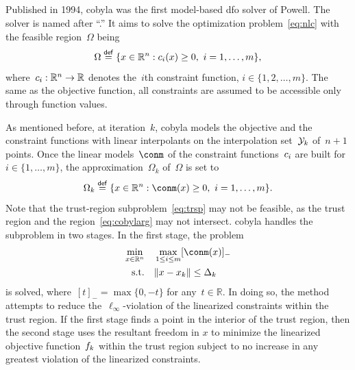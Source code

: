 \documentclass[
    smallextended,  %
    final,        %
]{svjour3}
\newcommand{\R}{\mathbb{R}}
\newcommand{\con}[1][i]{c\ifthenelse{\equal{#1}{}}{}{_{#1}}}
\newcommand{\eqdef}{\mathrel{\stackrel{\mathsf{def}}{=}}}
\newcommand{\fsetm}[1][k]{\Omega_{#1}}
\newcommand{\fset}{\Omega}
\newcommand{\iter}[1][k]{x\ifthenelse{\equal{#1}{}}{}{_{#1}}}
\newcommand{\norm}[2][]{#1\lVert#2#1\rVert}
\newcommand{\objm}[1][k]{\obj\ifthenelse{\equal{#1}{}}{}{_{#1}}}
\newcommand{\obj}{f}
\newcommand{\rad}[1][k]{\Delta\ifthenelse{\equal{#1}{}}{}{_{#1}}}
\newcommand{\set}[2][]{#1\{#2#1\}}
\newcommand{\st}{\text{s.t.}}
\newcommand{\xpt}[1][k]{\mathcal{Y}\ifthenelse{\equal{#1}{}}{}{_{#1}}}
\begin{document}
\subsection{}
\label{ssec:cobyla}

Published in 1994, \gls{cobyla} was the first model-based \gls{dfo} solver of Powell.
The solver is named after ``.''
It aims to solve the optimization problem~\eqref{eq:nlc} with the feasible region~$\fset$ being
\begin{equation*}
    \fset \eqdef \set{x \in \R^n : \con(x) \ge 0, ~ i = 1, \dots, m},
\end{equation*}
where~$\con : \R^n \to \R$ denotes the~$i$th constraint function, $i \in \set{1, 2, \dots, m}$.
The same as the objective function, all constraints are assumed to be accessible only through function values.

As mentioned before, at iteration~$k$, \gls{cobyla} models the objective and the constraint functions with {linear}
interpolants on the interpolation set~$\xpt$ of~$n + 1$ points.
Once the linear models~$\conm$ of the constraint functions~$\con$ are built for~$i \in \set{1, \dots, m}$, the approximation~$\fsetm$ of~$\fset$ is set to
\begin{equation}
    \label{eq:cobylarg}
    \fsetm \eqdef \set{x \in \R^n : \conm(x) \ge 0, ~ i=1, \dots, m}.
\end{equation}
Note that the trust-region subproblem~\eqref{eq:trsp} may not be feasible,
as the trust region and the region~\eqref{eq:cobylarg} may not intersect.
\gls{cobyla} handles the subproblem in two stages. In the first stage, the problem
\begin{equation}
    \label{eq:cobyla_sp1}
    \begin{split}
    \min_{x \in \R^n}   & \quad \max_{1 \le i \le m} [\conm(x)]_{-}\\
    \st                 & \quad \norm{x - \iter} \le \rad
    \end{split}
\end{equation}
is solved, where~$[t]_{-} = \max \set{0, -t}$ for any~$t\in \R$.
In doing so, the method attempts to reduce the~$\ell_{\infty}$-violation of the linearized constraints within the trust region.
If the first stage finds a point in the interior of the trust region,
then the second stage uses the resultant freedom in $x$ to minimize the linearized objective
function~$\objm$ within the trust region subject to no increase in any greatest violation of the
linearized constraints.
\end{document}
